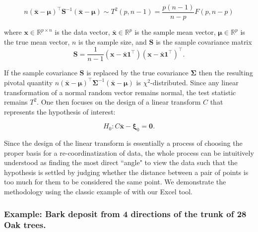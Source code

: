 \documentclass[article]{jss}
\begin{document}
        \[n{\left( {\bar{\textbf{x}} - {\boldsymbol{\mu}}} \right)^ \intercal}{\textbf{S}^{ - 1}}\left( {\bar{\textbf{x}} - {\boldsymbol{\mu}}} \right) \sim T^2(p, n-1) = \frac{{p\left( {n - 1} \right)}}{{n - p}}F\left( {p,n - p} \right) \]
        
        where $\textbf{x} \in \mathbb{R}^{p\times n}$ is the data vector, 
        $\bar{\textbf{x}} \in \mathbb{R}^p$ is the sample mean vector, 
        $\boldsymbol{\mu} \in \mathbb{R}^p$ is the true mean vector,
        $n$ is the sample size, and 
        $\textbf{S}$ is the sample covariance matrix
        \[\textbf{S} = \frac{1}{{n - 1}}\left( {\textbf{x} - \bar{\textbf{x}}{\textbf{1}^\intercal}} \right){\left( {\textbf{x} - \bar{\textbf{x}}{\textbf{1}^\intercal}} \right)^\intercal}.\]
        
        
        If the sample covariance $\textbf{S}$ is replaced by the true covariance
        $\boldsymbol{\Sigma}$ then the resulting pivotal quantity $n{\left( {\bar{\textbf{x}} - {\boldsymbol{\mu}}} \right)^ \intercal}{\boldsymbol{\Sigma}^{ - 1}}\left( {\bar{\textbf{x}} - {\boldsymbol{\mu}}} \right)$
        is $\chi^2$-distributed.
        Since any linear transformation of a normal random vector remains normal, the test statistic remains $T^2$. One then focuses on the design of a linear transform $C$ that represents the hypothesis of interest: 
        
        \[H_0: C\bar{\textbf{x}} - \boldsymbol{\xi}_0 = \textbf{0}.\]
        
        
        
        Since the design of the linear transform is essentially a process of choosing the proper basis for a re-coordinatization of data, the whole process can be intuitively understood as finding the most direct ``angle" to view the data such that the hypothesis is settled by judging whether the distance between a pair of points is too much for them to be considered the same point. We demonstrate the methodology using the classic example of \cite{rao1948corkboring} with our Excel tool.
        
        
        
        \subsubsection{Example: Bark deposit from 4 directions of the trunk of 28 Oak trees.}
        
\end{document}

